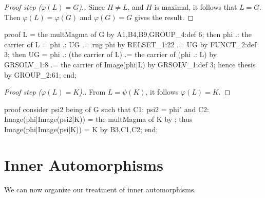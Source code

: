 \begin{proof}[Proof step ($\varphi(L)=G$).]
Since $H\neq L$, and $H$ is maximal, it follows that $L=G$. Then
$\varphi(L)=\varphi(G)$ and $\varphi(G)=G$ gives the result.
\end{proof}

\nwenddocs{}\endmoddef\nwstartdeflinemarkup{}\nwenddeflinemarkup
proof
  L = the multMagma of G by A1,B4,B9,GROUP_4:def 6;
  then phi .: the carrier of L = phi .: UG
                              .= rng phi by RELSET_1:22
                              .= UG by FUNCT_2:def 3;
  then UG = phi .: (the carrier of L)
         .= the carrier of (phi .: L) by GRSOLV_1:8
         .= the carrier of Image(phi|L) by GRSOLV_1:def 3;
  hence thesis by GROUP_2:61;
end;
\nwendcode{}\nwdocspar

\begin{proof}[Proof step ($\varphi(L)=K$).]
From $L=\psi(K)$, it follows $\varphi(L)=K$.
\end{proof}

\nwenddocs{}\endmoddef\nwstartdeflinemarkup{}\nwenddeflinemarkup
proof
  consider psi2 being  of G such that
  C1: psi2 = phi" and
  C2: Image(phi|Image(psi2|K)) = the multMagma of K
  by ;
  thus Image(phi|Image(psi|K)) = K by B3,C1,C2;
end;
\nwendcode{}\nwdocspar
\nwenddocs{}%
\section{Inner Automorphisms}\label{sec:characteristic:inner-automorphism}
We can now organize our treatment of inner automorphisms.


